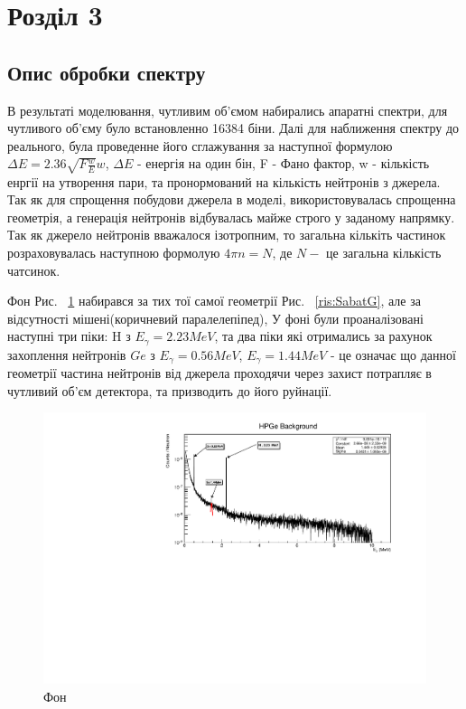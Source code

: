 \documentclass[a4paper, 14pt]{article}
\numberwithin{equation}{section}
\numberwithin{table}{section}
\begin{document}
	
\newpage 
\section{Розділ 3}
\setcounter{figure}{0}
\subsection{Опис обробки спектру}

В результаті моделювання, чутливим об'ємом набирались апаратні спектри, для чутливого об'єму було встановленно 16384 біни. Далі для наближення спектру до реального, була проведенне його сглажування за наступної формулою $\Delta{E} = 2.36 \sqrt{F  \frac{w}{E}}  w$, $\Delta{E}$ - енергія на один бін, F - Фано фактор, w - кількість енргії на утворення пари, та пронормований на кількість нейтронів з джерела. Так як для спрощення побудови джерела в моделі, використовувалась спрощенна геометрія, а генерація нейтронів відбувалась майже строго у заданому напрямку. Так як джерело нейтронів вважалося ізотропним, то загальна кількіть частинок розраховувалась наступною формолую $ 4 \pi n = N$, де $N -$ це загальна кількість чатсинок.

Фон Рис. ~\ref{ris:FonPicks} набирався за тих тої самої геометрії Рис. ~\ref{ris:SabatG}, але за відсутності мішені(коричневий паралелепіпед), У фоні були проаналізовані наступні три піки: H з $E_\gamma = 2.23 MeV$, та два піки які отримались за рахунок захоплення нейтронів $Ge$ з $E_\gamma = 0.56MeV$, $E_\gamma = 1.44 MeV$ - це означає що данної геометрії частина нейтронів від джерела проходячи через захист потрапляє в чутливий об'єм детектора, та призводить до його руйнації. 
\begin{figure}[hbt!]
	\centering \includegraphics[width=1\textwidth]{res/smFonPiscks.pdf}
	\caption{Фон} 
	\label{ris:FonPicks}	
\end{figure} 
\end{document}
